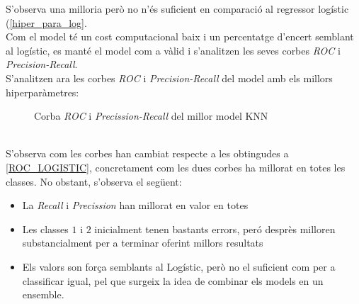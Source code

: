 \documentclass[a4paper, 11pt]{article}
\begin{document}
\hspace{-1.6em}S'observa una milloria però no n'és suficient en comparació al regressor logístic (\textcolor{blue}{\ref{hiper_para_log}}.\\
Com el model té un cost computacional baix i un percentatge d'encert semblant al logístic, es manté el model com a vàlid i s'analitzen les seves corbes \textit{ROC} i \textit{Precision-Recall}.\\
\hspace{-1.6em}S'analitzen ara les corbes \textit{ROC} i \textit{Precision-Recall} del model amb els millors hiperparàmetres:\\
\vspace{-2em}
\begin{figure}[h]
\centering
    \caption{Corba \textit{ROC} i \textit{Precission-Recall} del millor model KNN}
    \label{fig:my_label}
\end{figure}\\
S'observa com les corbes han cambiat respecte a les obtingudes a \textcolor{blue}{\ref{ROC_LOGISTIC}}, concretament com les dues corbes ha millorat en totes les classes.
No obstant, s'observa el següent:
\begin{itemize}
    \item La \textit{Recall} i \textit{Precission} han millorat en valor en totes
    \item Les classes $1$ i $2$ inicialment tenen bastants errors, peró desprès milloren substancialment per a terminar oferint millors resultats
    \item Els valors son força semblants al Logístic, però no el suficient com per a classificar igual, pel que surgeix la idea de combinar els models en un ensemble. 
\end{itemize}
\newpage
\end{document}
